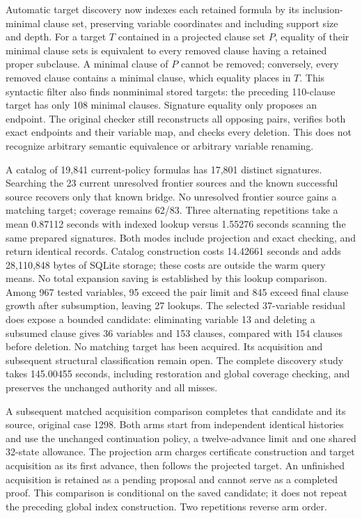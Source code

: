 \documentclass[11pt,a4paper]{article}
\numberwithin{equation}{section}
\theoremstyle{plain}
\theoremstyle{definition}
\theoremstyle{remark}
\begin{document}
Automatic target discovery now indexes each retained formula by its inclusion-minimal clause set, preserving variable coordinates and including support size and depth. For a target $T$ contained in a projected clause set $P$, equality of their minimal clause sets is equivalent to every removed clause having a retained proper subclause. A minimal clause of $P$ cannot be removed; conversely, every removed clause contains a minimal clause, which equality places in $T$. This syntactic filter also finds nonminimal stored targets: the preceding 110-clause target has only 108 minimal clauses. Signature equality only proposes an endpoint. The original checker still reconstructs all opposing pairs, verifies both exact endpoints and their variable map, and checks every deletion. This does not recognize arbitrary semantic equivalence or arbitrary variable renaming.

A catalog of 19,841 current-policy formulas has 17,801 distinct signatures. Searching the 23 current unresolved frontier sources and the known successful source recovers only that known bridge. No unresolved frontier source gains a matching target; coverage remains 62/83. Three alternating repetitions take a mean 0.87112 seconds with indexed lookup versus 1.55276 seconds scanning the same prepared signatures. Both modes include projection and exact checking, and return identical records. Catalog construction costs 14.42661 seconds and adds 28,110,848 bytes of SQLite storage; these costs are outside the warm query means. No total expansion saving is established by this lookup comparison. Among 967 tested variables, 95 exceed the pair limit and 845 exceed final clause growth after subsumption, leaving 27 lookups. The selected 37-variable residual does expose a bounded candidate: eliminating variable 13 and deleting a subsumed clause gives 36 variables and 153 clauses, compared with 154 clauses before deletion. No matching target has been acquired. Its acquisition and subsequent structural classification remain open. The complete discovery study takes 145.00455 seconds, including restoration and global coverage checking, and preserves the unchanged authority and all misses.

A subsequent matched acquisition comparison completes that candidate and its source, original case 1298. Both arms start from independent identical histories and use the unchanged continuation policy, a twelve-advance limit and one shared 32-state allowance. The projection arm charges certificate construction and target acquisition as its first advance, then follows the projected target. An unfinished acquisition is retained as a pending proposal and cannot serve as a completed proof. This comparison is conditional on the saved candidate; it does not repeat the preceding global index construction. Two repetitions reverse arm order.
\end{document}
